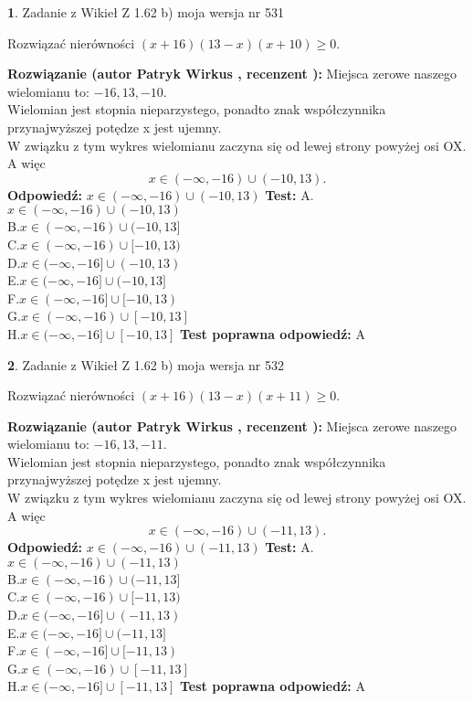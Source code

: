 \documentclass[12pt, a4paper]{article}
\theoremstyle{definition} %
\newtheorem{zad}{}
\newcommand{\zadStart}[1]{\begin{zad}#1\newline}
\newcommand{\zadStop}{\end{zad}}
\newcommand{\rozwStart}[2]{\noindent \textbf{Rozwiązanie (autor #1 , recenzent #2): }\newline}
\newcommand{\rozwStop}{\newline}
\newcommand{\odpStart}{\noindent \textbf{Odpowiedź:}\newline}
\newcommand{\odpStop}{\newline}
\newcommand{\testStart}{\noindent \textbf{Test:}\newline}
\newcommand{\testStop}{\newline}
\newcommand{\kluczStart}{\noindent \textbf{Test poprawna odpowiedź:}\newline}
\newcommand{\kluczStop}{\newline}
\begin{document}
\zadStart{Zadanie z Wikieł Z 1.62 b) moja wersja nr 531}

Rozwiązać nierówności $(x+16)(13-x)(x+10)\ge0$.
\zadStop
\rozwStart{Patryk Wirkus}{}
Miejsca zerowe naszego wielomianu to: $-16, 13, -10$.\\
Wielomian jest stopnia nieparzystego, ponadto znak współczynnika przy\linebreak najwyższej potędze x jest ujemny.\\ W związku z tym wykres wielomianu zaczyna się od lewej strony powyżej osi OX. A więc $$x \in (-\infty,-16) \cup (-10,13).$$
\rozwStop
\odpStart
$x \in (-\infty,-16) \cup (-10,13)$
\odpStop
\testStart
A.$x \in (-\infty,-16) \cup (-10,13)$\\
B.$x \in (-\infty,-16) \cup (-10,13]$\\
C.$x \in (-\infty,-16) \cup [-10,13)$\\
D.$x \in (-\infty,-16] \cup (-10,13)$\\
E.$x \in (-\infty,-16] \cup (-10,13]$\\
F.$x \in (-\infty,-16] \cup [-10,13)$\\
G.$x \in (-\infty,-16) \cup [-10,13]$\\
H.$x \in (-\infty,-16] \cup [-10,13]$
\testStop
\kluczStart
A
\kluczStop



\zadStart{Zadanie z Wikieł Z 1.62 b) moja wersja nr 532}

Rozwiązać nierówności $(x+16)(13-x)(x+11)\ge0$.
\zadStop
\rozwStart{Patryk Wirkus}{}
Miejsca zerowe naszego wielomianu to: $-16, 13, -11$.\\
Wielomian jest stopnia nieparzystego, ponadto znak współczynnika przy\linebreak najwyższej potędze x jest ujemny.\\ W związku z tym wykres wielomianu zaczyna się od lewej strony powyżej osi OX. A więc $$x \in (-\infty,-16) \cup (-11,13).$$
\rozwStop
\odpStart
$x \in (-\infty,-16) \cup (-11,13)$
\odpStop
\testStart
A.$x \in (-\infty,-16) \cup (-11,13)$\\
B.$x \in (-\infty,-16) \cup (-11,13]$\\
C.$x \in (-\infty,-16) \cup [-11,13)$\\
D.$x \in (-\infty,-16] \cup (-11,13)$\\
E.$x \in (-\infty,-16] \cup (-11,13]$\\
F.$x \in (-\infty,-16] \cup [-11,13)$\\
G.$x \in (-\infty,-16) \cup [-11,13]$\\
H.$x \in (-\infty,-16] \cup [-11,13]$
\testStop
\kluczStart
A
\kluczStop
\end{document}
